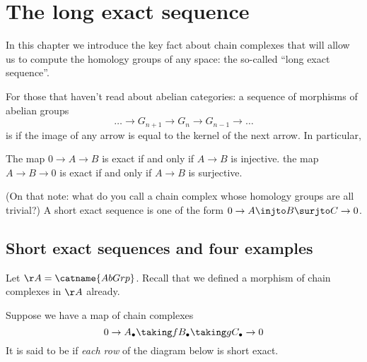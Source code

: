 \chapter{The long exact sequence}
In this chapter we introduce the key fact about chain complexes that will allow us to compute
the homology groups of any space: the so-called ``long exact sequence''.

For those that haven't read about abelian categories:
a sequence of morphisms of abelian groups
\[ \dots \to G_{n+1} \to G_n \to G_{n-1} \to \dots \]
is  if the image of any arrow is equal to the kernel of the next arrow.
In particular,
\begin{itemize}
	\ii The map $0 \to A \to B$ is exact if and only if $A \to B$ is injective.
	\ii the map $A \to B \to 0$ is exact if and only if $A \to B$ is surjective.
\end{itemize}
(On that note: what do you call a chain complex whose homology groups are all trivial?)
A short exact sequence is one of the form $0 \to A \injto B \surjto C \to 0$.

\section{Short exact sequences and four examples}
Let $\AA = \catname{AbGrp}$.
Recall that we defined a morphism of chain complexes in $\AA$ already.
\begin{definition}
Suppose we have a map of chain complexes
\[ 0 \to A_\bullet \taking f B_\bullet \taking g C_\bullet \to 0 \]
It is said to be  if \emph{each row} of the diagram below is short exact.
\begin{center}
\end{center}
\end{definition}

